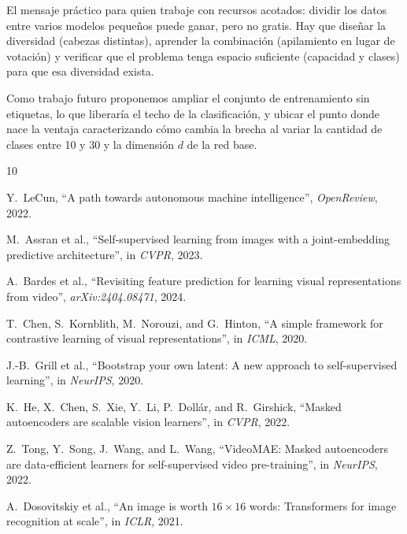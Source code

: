 \documentclass[runningheads]{llncs}
\begin{document}
El mensaje práctico para quien trabaje con recursos acotados: dividir los datos
entre varios modelos pequeños puede ganar, pero no gratis. Hay que diseñar la
diversidad (cabezas distintas), aprender la combinación (apilamiento en lugar
de votación) y verificar que el problema tenga espacio suficiente (capacidad y
clases) para que esa diversidad exista.

Como trabajo futuro proponemos ampliar el conjunto de entrenamiento sin
etiquetas, lo que liberaría el techo de la clasificación, y ubicar el punto
donde nace la ventaja caracterizando cómo cambia la brecha al variar la
cantidad de clases entre 10 y 30 y la dimensión $d$ de la red base.


{\footnotesize
\begin{thebibliography}{10}
\scriptsize

Y.~LeCun,
``A path towards autonomous machine intelligence'',
\emph{OpenReview}, 2022.

M.~Assran et al.,
``Self-supervised learning from images with a joint-embedding predictive
architecture'',
in \emph{CVPR}, 2023.

A.~Bardes et al.,
``Revisiting feature prediction for learning visual representations from
video'',
\emph{arXiv:2404.08471}, 2024.

T.~Chen, S.~Kornblith, M.~Norouzi, and G.~Hinton,
``A simple framework for contrastive learning of visual representations'',
in \emph{ICML}, 2020.

J.-B.~Grill et al.,
``Bootstrap your own latent: A new approach to self-supervised learning'',
in \emph{NeurIPS}, 2020.

K.~He, X.~Chen, S.~Xie, Y.~Li, P.~Dollár, and R.~Girshick,
``Masked autoencoders are scalable vision learners'',
in \emph{CVPR}, 2022.

Z.~Tong, Y.~Song, J.~Wang, and L.~Wang,
``VideoMAE: Masked autoencoders are data-efficient learners for
self-supervised video pre-training'',
in \emph{NeurIPS}, 2022.

A.~Dosovitskiy et al.,
``An image is worth $16{\times}16$ words: Transformers for image recognition
at scale'',
in \emph{ICLR}, 2021.


\end{thebibliography}}
\end{document}
